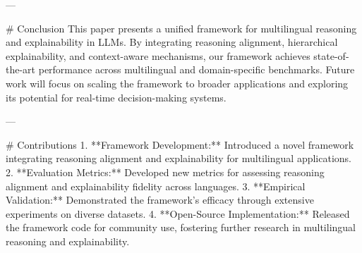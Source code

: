 ---

# Conclusion  
This paper presents a unified framework for multilingual reasoning and explainability in LLMs. By integrating reasoning alignment, hierarchical explainability, and context-aware mechanisms, our framework achieves state-of-the-art performance across multilingual and domain-specific benchmarks. Future work will focus on scaling the framework to broader applications and exploring its potential for real-time decision-making systems.

---

# Contributions  
1. **Framework Development:** Introduced a novel framework integrating reasoning alignment and explainability for multilingual applications.  
2. **Evaluation Metrics:** Developed new metrics for assessing reasoning alignment and explainability fidelity across languages.  
3. **Empirical Validation:** Demonstrated the framework's efficacy through extensive experiments on diverse datasets.  
4. **Open-Source Implementation:** Released the framework code for community use, fostering further research in multilingual reasoning and explainability.
